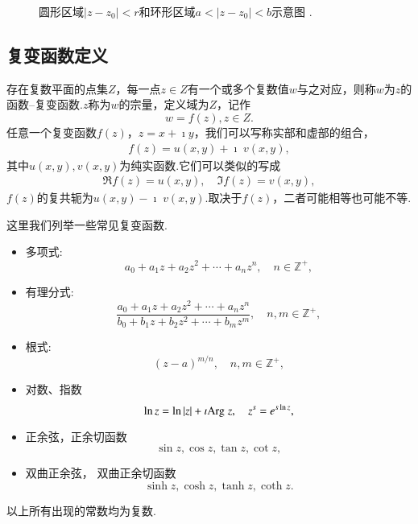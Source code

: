 \begin{figure}
    \centering

    
    \caption{圆形区域$\left|z-z_0\right|<r$和环形区域$a<\left|z-z_0\right|<b$示意图 .}
    \label{fig:annular}
\end{figure}


\subsection{复变函数定义}
\label{sub:cmplx_func_def}

存在复数平面的点集$Z$，每一点$z\in Z$有一个或多个复数值$w$与之对应，则称$w$为$z$的函数--复变函数.$z$称为$w$的宗量，定义域为$Z$，记作
\begin{equation}
    w = f(z), z\in Z .
\end{equation}
任意一个复变函数$f(z)$，$z=x + \imath y$，我们可以写称实部和虚部的组合，
\begin{align}
    f(z) = u(x,y) +\imath \; v(x,y) ,
\end{align}
其中$u(x,y), v(x,y)$为纯实函数.它们可以类似的写成
\begin{align}
    \Re f(z) = u(x,y), \quad \Im f(z) = v(x,y) ,
\end{align}
$f(z)$的复共轭为$u(x,y) - \imath \; v(x,y)$.取决于$f(z)$，二者可能相等也可能不等.

这里我们列举一些常见复变函数.
\begin{itemize}
    \item 多项式:
        \begin{equation}
            a_0 + a_1 z + a_2 z^2 + \cdots + a_n z^n , \quad n\in \mathbb{Z}^+ ,
        \end{equation}
    \item 有理分式:       
         \begin{equation}
        \frac{a_0 + a_1 z + a_2 z^2 + \cdots + a_n z^n}{{b_0 + b_1 z + b_2 z^2 + \cdots + b_m z^m}} , \quad  n,m\in \mathbb{Z}^+ ,
        \end{equation}
    \item 根式:
        \begin{equation}
            (z-a)^{m/n} , \quad  n,m\in \mathbb{Z}^+ ,
        \end{equation}
    \item 对数、指数
        \begin{equation}
            \ln z = \ln |z| + \imath {\mathrm{Arg}\;} z, \quad z^s = e^{s\ln z} ,
        \end{equation}
    \item 正余弦，正余切函数 
        \begin{equation}
            \sin z , \cos z , \tan z, \cot z ,
        \end{equation}
    \item 双曲正余弦， 双曲正余切函数
        \begin{equation}
            \sinh z , \cosh z , \tanh z, \coth z  .
        \end{equation}
\end{itemize}
以上所有出现的常数均为复数.

